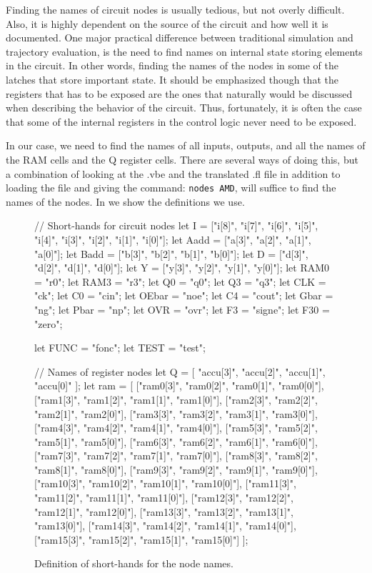 Finding the names of circuit nodes%
%
{} is usually tedious, but
not overly difficult.
Also, it is highly dependent on the source of the circuit and how
well it is documented.
One major practical difference between traditional simulation and
trajectory evaluation, is the  need to
find names on internal state storing elements%
%
{} in the circuit.
In other words, finding the names of the nodes in some of the
latches that store important state.
It should be emphasized though that the registers that has to be
exposed are the ones that naturally would be discussed when
describing the behavior of the circuit.
Thus, fortunately, it is often the case that some of the internal
registers in the control logic never need to be exposed.

In our case, we need to find the names of all inputs, outputs, and all
the names of the RAM cells and the Q register cells.
There are several ways of doing this, but a combination
of looking at the .vbe and the translated .fl file in addition
to loading the file and giving the command:
{\tt nodes AMD},
%
will suffice to find the names of the nodes.
In  we show the definitions we use.
\begin{figure}[hbtp]
\begin{hol}
// Short-hands for circuit nodes
let I     = ["i[8]", "i[7]", "i[6]", "i[5]", "i[4]",
             "i[3]", "i[2]", "i[1]", "i[0]"];
let Aadd  = ["a[3]", "a[2]", "a[1]", "a[0]"];
let Badd  = ["b[3]", "b[2]", "b[1]", "b[0]"];
let D     = ["d[3]", "d[2]", "d[1]", "d[0]"];
let Y     = ["y[3]", "y[2]", "y[1]", "y[0]"];
let RAM0  = "r0";
let RAM3  = "r3";
let Q0    = "q0";
let Q3    = "q3";
let CLK   = "ck";
let C0    = "cin";
let OEbar = "noe";
let C4    = "cout";
let Gbar  = "ng";
let Pbar  = "np";
let OVR   = "ovr";
let F3    = "signe";
let F30   = "zero";

let FUNC  = "fonc";
let TEST  = "test";

// Names of register nodes
let Q   = [  "accu[3]", "accu[2]", "accu[1]", "accu[0]"  ];
let ram = [ ["ram0[3]", "ram0[2]", "ram0[1]", "ram0[0]"],
            ["ram1[3]", "ram1[2]", "ram1[1]", "ram1[0]"],
            ["ram2[3]", "ram2[2]", "ram2[1]", "ram2[0]"],
            ["ram3[3]", "ram3[2]", "ram3[1]", "ram3[0]"],
            ["ram4[3]", "ram4[2]", "ram4[1]", "ram4[0]"],
            ["ram5[3]", "ram5[2]", "ram5[1]", "ram5[0]"],
            ["ram6[3]", "ram6[2]", "ram6[1]", "ram6[0]"],
            ["ram7[3]", "ram7[2]", "ram7[1]", "ram7[0]"],
            ["ram8[3]", "ram8[2]", "ram8[1]", "ram8[0]"],
            ["ram9[3]", "ram9[2]", "ram9[1]", "ram9[0]"],
            ["ram10[3]", "ram10[2]", "ram10[1]", "ram10[0]"],
            ["ram11[3]", "ram11[2]", "ram11[1]", "ram11[0]"],
            ["ram12[3]", "ram12[2]", "ram12[1]", "ram12[0]"],
            ["ram13[3]", "ram13[2]", "ram13[1]", "ram13[0]"],
            ["ram14[3]", "ram14[2]", "ram14[1]", "ram14[0]"],
            ["ram15[3]", "ram15[2]", "ram15[1]", "ram15[0]"] ];

\end{hol}
\caption{Definition of short-hands for the node names.}
\label{AMD2901NodeNames}
\end{figure}
